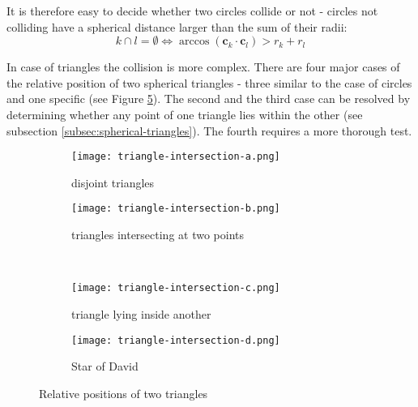 It is therefore easy to decide whether two circles collide or not - circles not colliding have a spherical distance larger than the sum of their radii:
$$k \cap l = \emptyset \Longleftrightarrow \arccos(\mathbf{c}_k\cdot\mathbf{c}_l)>r_k+r_l$$

In case of triangles the collision is more complex. There are four major cases of the relative position of two spherical triangles - three  similar to the case of circles and one specific (see Figure \ref{fig:triangle-collisions}). The second and the third case can be resolved by determining whether any point of one triangle lies within the other (see subsection \ref{subsec:spherical-triangles}). The fourth requires a more thorough test.

\begin{figure}[ht]
\centering
\begin{subfigure}{7cm}
\texttt{[image: triangle-intersection-a.png]}
\caption{disjoint triangles}
\label{fig:disjoint-triangles}
\end{subfigure}
\hspace*{1cm}
\begin{subfigure}{7cm}
\texttt{[image: triangle-intersection-b.png]}
\caption{triangles intersecting at two points}
\label{fig:triangles-intersecting-at-two-points}
\end{subfigure}\\
\begin{subfigure}{7cm}
\texttt{[image: triangle-intersection-c.png]}
\caption{triangle lying inside another}
\label{fig:triangle-lying-inside-another}
\end{subfigure}
\hspace*{1cm}
\begin{subfigure}{7cm}
\texttt{[image: triangle-intersection-d.png]}
\caption{Star of David}
\label{fig:star-of-david}
\end{subfigure}
\caption{Relative positions of two triangles}
\label{fig:triangle-collisions}
\end{figure}


